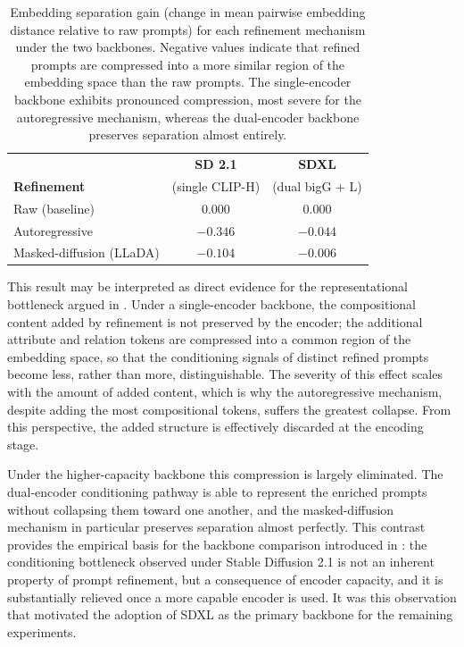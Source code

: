 \documentclass[a4paper,twoside,12pt]{report}
\begin{document}
\begin{table}[H]
\centering
\begin{tabular}{lcc}
\toprule
 & \textbf{SD 2.1} & \textbf{SDXL} \\
\textbf{Refinement} & (single CLIP-H) & (dual bigG + L) \\
\midrule
Raw (baseline)          & \(0.000\)  & \(0.000\)  \\
Autoregressive          & \(-0.346\) & \(-0.044\) \\
Masked-diffusion (LLaDA)& \(-0.104\) & \(-0.006\) \\
\bottomrule
\end{tabular}
\caption[Embedding separation gain by backbone]{Embedding separation gain
(change in mean pairwise embedding distance relative to raw prompts) for each
refinement mechanism under the two backbones. Negative values indicate that
refined prompts are compressed into a more similar region of the embedding
space than the raw prompts. The single-encoder backbone exhibits pronounced
compression, most severe for the autoregressive mechanism, whereas the
dual-encoder backbone preserves separation almost entirely.}
\label{tab:rq1_separation}
\end{table}

This result may be interpreted as direct evidence for the representational
bottleneck argued in . Under a single-encoder backbone, the
compositional content added by refinement is not preserved by the encoder; the
additional attribute and relation tokens are compressed into a common region of
the embedding space, so that the conditioning signals of distinct refined
prompts become less, rather than more, distinguishable. The severity of this
effect scales with the amount of added content, which is why the autoregressive
mechanism, despite adding the most compositional tokens, suffers the greatest
collapse. From this perspective, the added structure is effectively discarded
at the encoding stage.

Under the higher-capacity backbone this compression is largely eliminated. The
dual-encoder conditioning pathway is able to represent the enriched prompts
without collapsing them toward one another, and the masked-diffusion mechanism
in particular preserves separation almost perfectly. This contrast provides the
empirical basis for the backbone comparison introduced in :
the conditioning bottleneck observed under Stable Diffusion 2.1 is not an
inherent property of prompt refinement, but a consequence of encoder capacity,
and it is substantially relieved once a more capable encoder is used. It was
this observation that motivated the adoption of SDXL as the primary backbone for
the remaining experiments.
\end{document}
